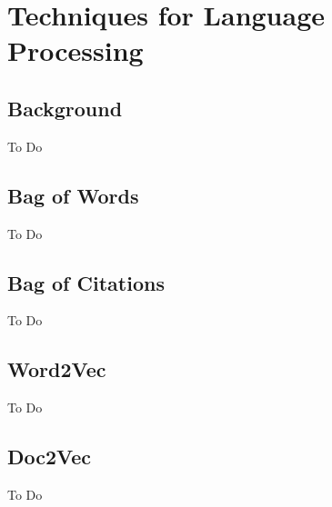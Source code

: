 \chapter{Techniques for Language Processing}
\section{Background}
To Do
\section{Bag of Words}
To Do
\section{Bag of Citations}
To Do
\section{Word2Vec}
To Do
\section{Doc2Vec}
To Do